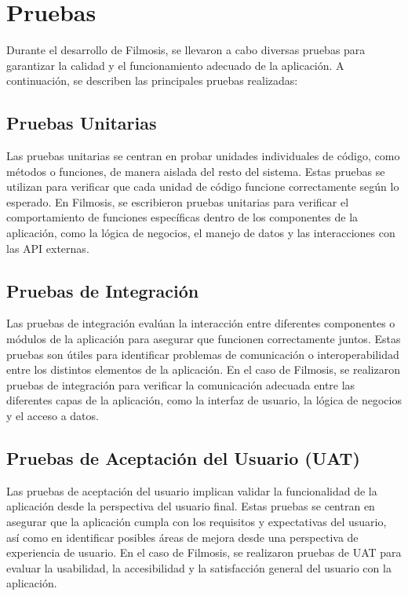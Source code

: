 \documentclass{article}
\begin{document}
\section{Pruebas}

Durante el desarrollo de Filmosis, se llevaron a cabo diversas pruebas para garantizar la calidad y el funcionamiento adecuado de la aplicación. A continuación, se describen las principales pruebas realizadas:

\subsection{Pruebas Unitarias}

Las pruebas unitarias se centran en probar unidades individuales de código, como métodos o funciones, de manera aislada del resto del sistema. Estas pruebas se utilizan para verificar que cada unidad de código funcione correctamente según lo esperado. En Filmosis, se escribieron pruebas unitarias para verificar el comportamiento de funciones específicas dentro de los componentes de la aplicación, como la lógica de negocios, el manejo de datos y las interacciones con las API externas.

\subsection{Pruebas de Integración}

Las pruebas de integración evalúan la interacción entre diferentes componentes o módulos de la aplicación para asegurar que funcionen correctamente juntos. Estas pruebas son útiles para identificar problemas de comunicación o interoperabilidad entre los distintos elementos de la aplicación. En el caso de Filmosis, se realizaron pruebas de integración para verificar la comunicación adecuada entre las diferentes capas de la aplicación, como la interfaz de usuario, la lógica de negocios y el acceso a datos.

\subsection{Pruebas de Aceptación del Usuario (UAT)}

Las pruebas de aceptación del usuario implican validar la funcionalidad de la aplicación desde la perspectiva del usuario final. Estas pruebas se centran en asegurar que la aplicación cumpla con los requisitos y expectativas del usuario, así como en identificar posibles áreas de mejora desde una perspectiva de experiencia de usuario. En el caso de Filmosis, se realizaron pruebas de UAT para evaluar la usabilidad, la accesibilidad y la satisfacción general del usuario con la aplicación.
\end{document}
